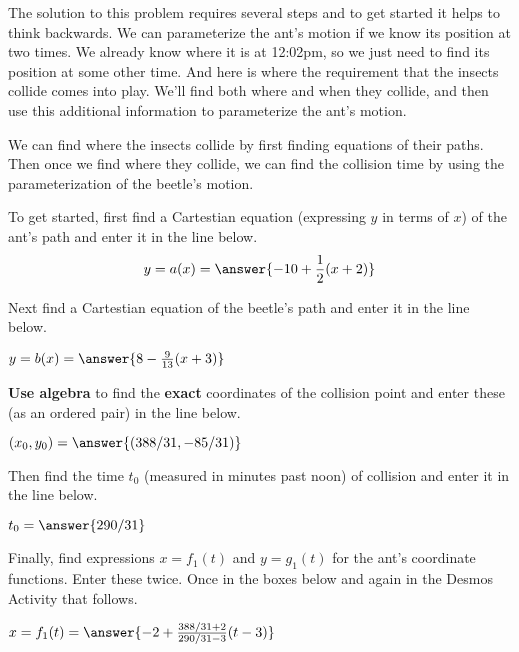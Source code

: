 \documentclass{ximera}
\begin{document}
\begin{explanation}
The solution to this problem requires several steps and to get started it helps to think backwards. We can parameterize the ant's motion if we know its position at two times. We already know where it is at 12:02pm, so we just need to find its position at some other time. And here is where the requirement that the insects collide comes into play. We'll find both where and when they collide, and then use this additional information to parameterize the ant's motion.

We can find where the insects collide by first finding equations of their paths. Then once we find where they collide, we can find the collision time by using the parameterization of the beetle's motion.


\begin{question}  
To get started, first find a Cartestian equation (expressing $y$ in terms of $x$) of the ant's path and enter it in the line below.
 \[
     y=a(x) =  \answer{-10+\frac{1}{2}(x+2)}
\] 
   \end{question}

Next find a Cartestian equation of the beetle's path and enter it in the line below.

\begin{question}  
         $ y=b(x) =  \answer{8-\frac{9}{13}(x+3)}$  
    \end{question}

{\bf Use algebra} to find the {\bf exact} coordinates of the collision point and enter these (as an ordered pair) in the line below.

\begin{question}  
         $ (x_0,y_0) =  \answer{(388/31 , -85/31)}$
    \end{question}

Then find the time $t_0$ (measured in minutes past noon) of collision and enter it in the line below.

\begin{question}  
         $ t_0 =  \answer{290/31}$
    \end{question}

Finally, find expressions $x=f_1(t)$ and $y=g_1(t)$ for the ant's coordinate functions. Enter these twice. Once in the boxes below and again in the Desmos Activity that follows.

\begin{question}  
         $ x = f_1(t) =   \answer{-2+\frac{388/31+2}{290/31-3}(t-3)}$


\end{question}
\end{explanation}
\end{document}

